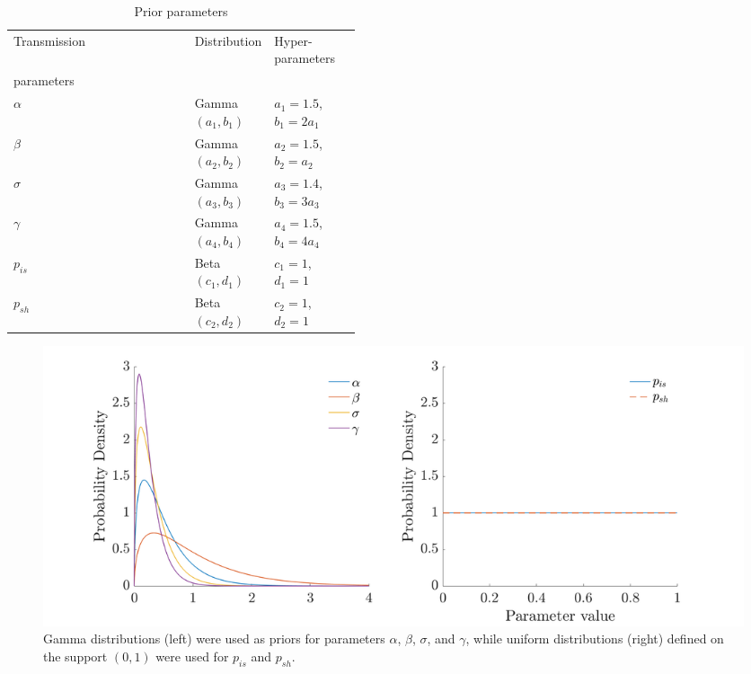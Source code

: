 \begin{table}[h!]
	\centering
	\caption{Prior parameters}
	\begin{tabular}[t]{l>{\raggedright\arraybackslash}p{0.2\linewidth}p{0.25\linewidth}}
		\toprule
		Transmission & Distribution & Hyper-parameters \\ parameters \\
		\midrule
		$\alpha$   & Gamma$(a_1, b_1)$ & $a_1 = 1.5$, $b_1 = 2 a_1$ \\
		$\beta$     & Gamma$(a_2, b_2)$ & $a_2 = 1.5$, $b_2 = a_2$ \\
		$\sigma$  & Gamma$(a_3, b_3)$ & $a_3 = 1.4$, $b_3 = 3 a_3$ \\
		$\gamma$& Gamma$(a_4, b_4)$ & $a_4 = 1.5$, $b_4 = 4 a_4$ \\
		$p_{is}$     & Beta$(c_1, d_1)$ & $c_1 = 1$, $d_1 = 1$ \\
		$p_{sh}$    & Beta$(c_2, d_2)$ & $c_2 = 1$, $d_2 = 1$ \\
		\bottomrule
	\end{tabular}
	\label{tab: prior parameters}
\end{table}

\begin{figure}[h!]
	\centering
	\includegraphics[scale=0.4]{Figs/priors}
	\caption{Gamma distributions (left) were used as priors for parameters $\alpha$, $\beta$, $\sigma$, and $\gamma$, while uniform distributions (right) defined on the support $(0,1)$ were used for $p_{is}$ and $p_{sh}$.}
	\label{fig:priors}
\end{figure}



